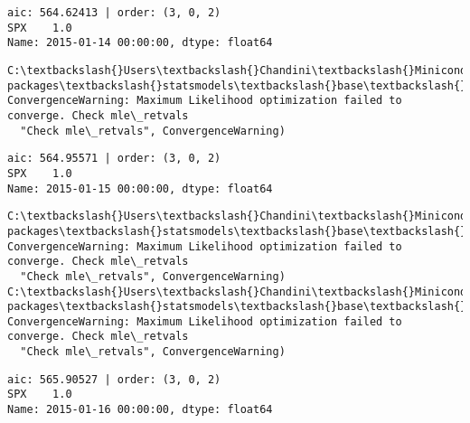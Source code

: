 \documentclass[11pt]{article}
\begin{document}
    \begin{Verbatim}[commandchars=\\\{\}]
aic: 564.62413 | order: (3, 0, 2)
SPX    1.0
Name: 2015-01-14 00:00:00, dtype: float64

    \end{Verbatim}

    \begin{Verbatim}[commandchars=\\\{\}]
C:\textbackslash{}Users\textbackslash{}Chandini\textbackslash{}Miniconda3\textbackslash{}envs\textbackslash{}auquan\textbackslash{}lib\textbackslash{}site-packages\textbackslash{}statsmodels\textbackslash{}base\textbackslash{}model.py:496: ConvergenceWarning: Maximum Likelihood optimization failed to converge. Check mle\_retvals
  "Check mle\_retvals", ConvergenceWarning)

    \end{Verbatim}

    \begin{Verbatim}[commandchars=\\\{\}]
aic: 564.95571 | order: (3, 0, 2)
SPX    1.0
Name: 2015-01-15 00:00:00, dtype: float64

    \end{Verbatim}

    \begin{Verbatim}[commandchars=\\\{\}]
C:\textbackslash{}Users\textbackslash{}Chandini\textbackslash{}Miniconda3\textbackslash{}envs\textbackslash{}auquan\textbackslash{}lib\textbackslash{}site-packages\textbackslash{}statsmodels\textbackslash{}base\textbackslash{}model.py:496: ConvergenceWarning: Maximum Likelihood optimization failed to converge. Check mle\_retvals
  "Check mle\_retvals", ConvergenceWarning)
C:\textbackslash{}Users\textbackslash{}Chandini\textbackslash{}Miniconda3\textbackslash{}envs\textbackslash{}auquan\textbackslash{}lib\textbackslash{}site-packages\textbackslash{}statsmodels\textbackslash{}base\textbackslash{}model.py:496: ConvergenceWarning: Maximum Likelihood optimization failed to converge. Check mle\_retvals
  "Check mle\_retvals", ConvergenceWarning)

    \end{Verbatim}

    \begin{Verbatim}[commandchars=\\\{\}]
aic: 565.90527 | order: (3, 0, 2)
SPX    1.0
Name: 2015-01-16 00:00:00, dtype: float64

    \end{Verbatim}
\end{document}
